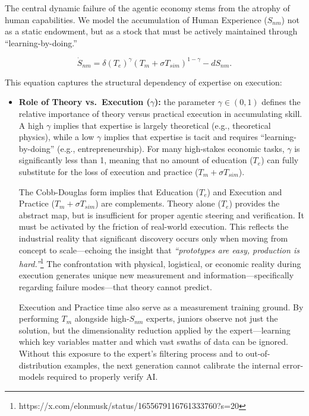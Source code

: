 \documentclass[12pt, letter]{article}
\begin{document}
The central dynamic failure of the agentic economy stems from the atrophy of human capabilities. We model the accumulation of Human Experience ($S_{nm}$) not as a static endowment, but as a stock that must be actively maintained through ``learning-by-doing.''

\begin{equation}
    \dot{S}_{nm} = \delta (T_e)^\gamma (T_m + \sigma T_{sim})^{1-\gamma} - d S_{nm}.
\end{equation}

This equation captures the structural dependency of expertise on execution:

\begin{itemize}
    \item \textbf{Role of Theory vs.\ Execution ($\gamma$):} the parameter $\gamma \in (0,1)$ defines the relative importance of theory versus practical execution in accumulating skill. A high $\gamma$ implies that expertise is largely theoretical (e.g., theoretical physics), while a low $\gamma$ implies that expertise is tacit and requires ``learning-by-doing'' (e.g., entrepreneurship). For many high-stakes economic tasks, $\gamma$ is significantly less than 1, meaning that no amount of education ($T_e$) can fully substitute for the loss of execution and practice ($T_m + \sigma T_{sim}$).

    The Cobb-Douglas form implies that Education ($T_e$) and Execution and Practice ($T_m + \sigma T_{sim}$) are complements. Theory alone ($T_e$) provides the abstract map, but is insufficient for proper agentic steering and verification. It must be activated by the friction of real-world execution. This reflects the industrial reality that significant discovery occurs only when moving from concept to scale—echoing the insight that \emph{``prototypes are easy, production is hard.''}\footnote{https://x.com/elonmusk/status/1655679116761333760?s=20} The confrontation with physical, logistical, or economic reality during execution generates unique new measurement and information—specifically regarding failure modes—that theory cannot predict. 

    Execution and Practice time also serve as a measurement training ground. By performing $T_m$ alongside high-$S_{nm}$ experts, juniors observe not just the solution, but the dimensionality reduction applied by the expert—learning which key variables matter and which vast swaths of data can be ignored. Without this exposure to the expert's filtering process and to out-of-distribution examples, the next generation cannot calibrate the internal error-models required to properly verify AI.


\end{itemize}
\end{document}
